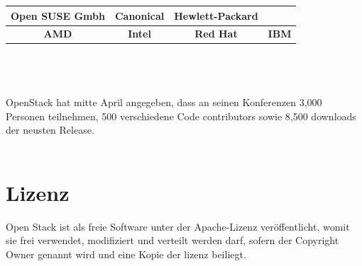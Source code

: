 \documentclass[a4paper,nochapterprefix,english,12pt]{scrreprt}
\begin{document}
\begin{table}[h]
\begin{tabular}{|c|c|c|c|}
\hline
\textbf{Open  SUSE Gmbh} & \textbf{Canonical} & \textbf{Hewlett-Packard} &                                 \\ \hline
\textbf{AMD}             & \textbf{Intel}     & \textbf{Red Hat}         &\textbf{IBM} 					   \\ \hline
\end{tabular}
\end{table} \cite{RS-WikiEntry}\cite{OS-WikiEntry} \\\\\\
OpenStack hat mitte April angegeben, dass an seinen Konferenzen 3,000 Personen teilnehmen, 500 verschiedene Code contributors sowie 8,500 downloads der neusten Release. \cite{allthreeverg}\\\\
\section{Lizenz}
Open Stack ist als freie Software unter der Apache-Lizenz veröffentlicht, womit sie frei verwendet, modifiziert und verteilt werden darf, sofern der Copyright Owner genannt wird und eine Kopie der lizenz beiliegt.\cite{OS-WikiEntry}

\newpage
\end{document}
